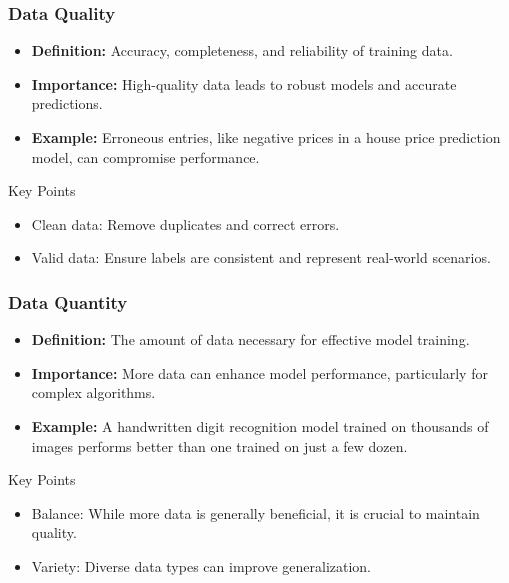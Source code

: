 \documentclass[aspectratio=169]{beamer}
\begin{document}
\begin{frame}[fragile]
    \frametitle{Data Quality}
    \begin{itemize}
        \item \textbf{Definition:} Accuracy, completeness, and reliability of training data.
        \item \textbf{Importance:} High-quality data leads to robust models and accurate predictions.
        \item \textbf{Example:} Erroneous entries, like negative prices in a house price prediction model, can compromise performance.
    \end{itemize}
    \begin{block}{Key Points}
        \begin{itemize}
            \item Clean data: Remove duplicates and correct errors.
            \item Valid data: Ensure labels are consistent and represent real-world scenarios.
        \end{itemize}
    \end{block}
\end{frame}

\begin{frame}[fragile]
    \frametitle{Data Quantity}
    \begin{itemize}
        \item \textbf{Definition:} The amount of data necessary for effective model training.
        \item \textbf{Importance:} More data can enhance model performance, particularly for complex algorithms.
        \item \textbf{Example:} A handwritten digit recognition model trained on thousands of images performs better than one trained on just a few dozen.
    \end{itemize}
    \begin{block}{Key Points}
        \begin{itemize}
            \item Balance: While more data is generally beneficial, it is crucial to maintain quality.
            \item Variety: Diverse data types can improve generalization.
        \end{itemize}
    \end{block}
\end{frame}
\end{document}
